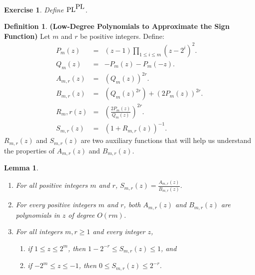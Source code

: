 \documentclass{amsbook}
\newtheorem{lemma}[theorem]{Lemma}
\newtheorem{exercise}[exernum]{Exercise}
\theoremstyle{definition}
\newtheorem{definition}[theorem]{Definition}
\theoremstyle{remark}
\numberwithin{section}{chapter}
\numberwithin{equation}{chapter}
\renewcommand{\PL}{\mbox{\rm PL}}
\begin{document}
\begin{exercise}
Define $\PL^{\PL}$.
\end{exercise}

\begin{definition}{\bf (Low-Degree Polynomials to Approximate the Sign Function)}
Let $m$ and $r$ be positive integers. Define:
\begin{eqnarray}
P_m(z) & = & (z-1)\prod_{1\leq i\leq m} (z-2^i)^2.\\
Q_m(z) & = & -P_m(z)-P_m(-z).\\
A_{m,r}(z) & = & (Q_m(z))^{2r}.\\
B_{m,r}(z) & = & (Q_m(z)^{2r})+(2P_m(z))^{2r}.\\
R_m,r(z) & = & \left(\frac{2P_m(z)}{Q_m(z)}\right)^{2r}.\\
S_{m,r}(z) & = & (1+R_{m,r}(z))^{-1}.
\end{eqnarray}
$R_{m,r}(z)$ and $S_{m,r}(z)$ are two auxiliary functions that will help us understand the properties of $A_{m,r}(z)$ and $B_{m,r}(z)$.
\end{definition}
\begin{lemma}\label{polynomiallemma1}
\begin{enumerate}
\item For all positive integers $m$ and $r$, $S_{m,r}(z)=\frac{A_{m,r}(z)}{B_{m,r}(z)}$.
\item For every positive integers $m$ and $r$, both $A_{m,r}(z)$ and $B_{m,r}(z)$ are polynomials in $z$ of degree $O(rm)$.
\item For all integers $m,r\geq 1$ and every integer $z$,
\begin{enumerate}
\item if $1\leq z\leq 2^m$, then $1-2^{-r}\leq S_{m,r}(z)\leq 1$, and 
\item if $-2^m\leq z\leq -1$, then $0\leq S_{m,r}(z)\leq 2^{-r}$.
\end{enumerate}
\end{enumerate}
\end{lemma}
\end{document}
